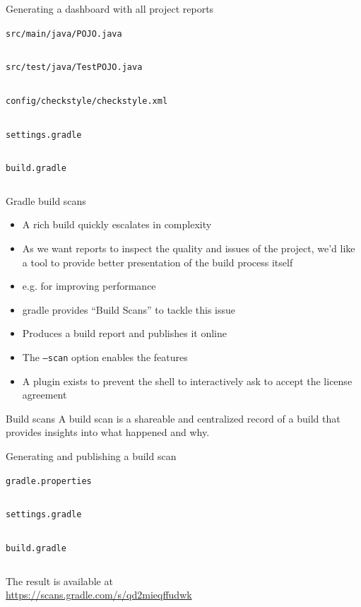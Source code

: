 \documentclass[presentation]{beamer}
\newcommand{\codefile}[4]{
	\begin{block}{\texttt{#2}}
		\inputminted[fontsize=#3,linenos=true,breaklines=true]{#4}{"workspace/#1/#2"}
	\end{block}
}
\newcommand{\java}[3]{\codefile{#1}{#2}{#3}{java}}
\newcommand{\kotlin}[3]{\codefile{#1}{#2}{#3}{kotlin}}
\newcommand{\tinier}{\fontsize{4pt}{5pt}\selectfont}
\begin{document}
\begin{frame}{Generating a dashboard with all project reports}
    \java{21-Dashboard}{src/main/java/POJO.java}{\tinier}
    \java{21-Dashboard}{src/test/java/TestPOJO.java}{\tinier}
    \begin{block}{\texttt{config/checkstyle/checkstyle.xml}}
        \inputminted[fontsize=\tiny,linenos=true,breaklines=true,firstline=1,lastline=25]{xml}{workspace/21-Dashboard/config/checkstyle/checkstyle.xml}
    \end{block}
    \kotlin{21-Dashboard}{settings.gradle}{\normalsize}
    \kotlin{21-Dashboard}{build.gradle}{\scriptsize}
\end{frame}

\begin{frame}[fragile]{Gradle build scans}
    \begin{itemize}
        \item A rich build quickly escalates in complexity
        \item As we want reports to inspect the quality and issues of the project, we'd like a tool to provide better presentation of the build process itself
        \item e.g. for improving performance
        \item gradle provides ``Build Scans'' to tackle this issue
        \item Produces a build report and publishes it online
        \item The \texttt{--scan} option enables the features
        \item A plugin exists to prevent the shell to interactively ask to accept the license agreement
    \end{itemize}
    \begin{block}{Build scans}
        A build scan is a shareable and centralized record of a build that provides insights into what happened and why.
    \end{block}
\end{frame}

\begin{frame}{Generating and publishing a build scan}
    \kotlin{22-Scans}{gradle.properties}{\scriptsize}
    \kotlin{22-Scans}{settings.gradle}{\normalsize}
    \kotlin{22-Scans}{build.gradle}{\tiny}
    \begin{block}{}
        The result is available at\\ \url{https://scans.gradle.com/s/qd2mieqffudwk}
    \end{block}
\end{frame}
\end{document}
